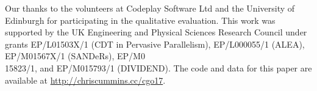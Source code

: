 \acks
Our thanks to the volunteers at Codeplay Software Ltd and the University of
Edinburgh for participating in the qualitative evaluation. This work was supported by the UK Engineering and Physical Sciences Research Council under grants EP/L01503X/1 (CDT in Pervasive Parallelism), EP/L000055/1 (ALEA), EP/M01567X/1 (SANDeRs), EP/M0\\15823/1, and EP/M015793/1 (DIVIDEND).
The code and data for this paper are available at \url{http://chriscummins.cc/cgo17}.